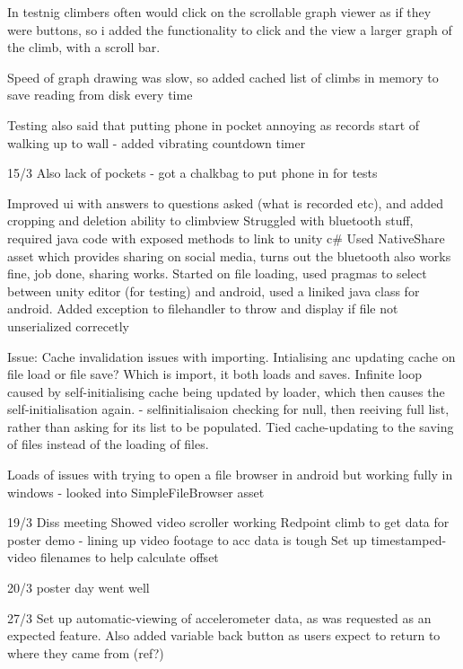 In testnig climbers often would click on the scrollable graph viewer as if they were buttons, so i added the functionality to click and the view a larger graph of the climb, with a scroll bar.

Speed of graph drawing was slow, so added cached list of climbs in memory to save reading from disk every time 

Testing also said that putting phone in pocket annoying as records start of walking up to wall - added vibrating countdown timer

15/3
Also lack of pockets - got a chalkbag to put phone in for tests

Improved ui with answers to questions asked (what is recorded etc), and added cropping and deletion ability to climbview
Struggled with bluetooth stuff, required java code with exposed methods to link to unity c#
Used NativeShare asset which provides sharing on social media, turns out the bluetooth also works fine, job done, sharing works.
Started on file loading, used pragmas to select between unity editor (for testing) and android, used a liniked java class for android.
Added exception to filehandler to throw and display if file not unserialized correcetly

Issue: Cache invalidation issues with importing. Intialising anc updating cache on file load or file save? Which is import, it both loads and saves.
Infinite loop caused by self-initialising cache being updated by loader, which then causes the self-initialisation again. - selfinitialisaion checking for null, then reeiving full list, rather than asking for its list to be populated. Tied cache-updating to the saving of files instead of the loading of files.

Loads of issues with trying to open a file browser in android but working fully in windows - looked into SimpleFileBrowser asset













19/3
Diss meeting
Showed video scroller working
Redpoint climb to get data for poster demo - lining up video footage to acc data is tough
Set up timestamped-video filenames to help calculate offset


20/3 poster day went well


27/3
Set up automatic-viewing of accelerometer data, as was requested as an expected feature.
Also added variable back button as users expect to return to where they came from (ref?)

